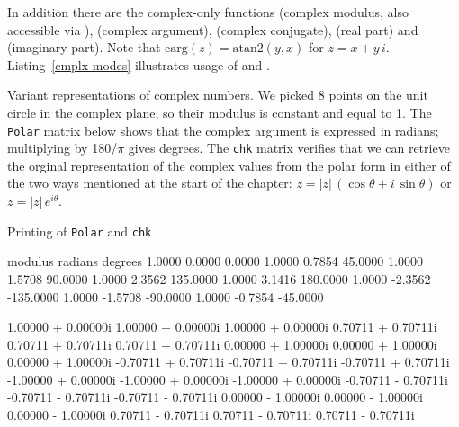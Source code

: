 In addition there are the complex-only functions 
(complex modulus, also accessible via ), 
(complex argument),  (complex conjugate), 
(real part) and  (imaginary part). Note that
$\mbox{carg}(z) = \mbox{atan2}(y,x)$ for $z=x +
y\,i$. Listing~\ref{cmplx-modes} illustrates usage of 
and .

\begin{script}[htbp]
  \caption{Variant representations of complex numbers. We picked 8
    points on the unit circle in the complex plane, so their modulus
    is constant and equal to 1. The \texttt{Polar} matrix below shows
    that the complex argument is expressed in radians; multiplying by
    180/$\pi$ gives degrees. The \texttt{chk} matrix verifies that
    we can retrieve the orginal representation of the complex values
    from the polar form in either of the two ways mentioned at the
    start of the chapter: $z = |z|\,(\cos \theta + i\,\sin \theta)$ or
    $z = |z|\,e^{i\theta}$.}
  \label{cmplx-modes}
  Printing of \texttt{Polar} and \texttt{chk}
\begin{scode}
     modulus     radians     degrees
      1.0000      0.0000      0.0000
      1.0000      0.7854     45.0000
      1.0000      1.5708     90.0000
      1.0000      2.3562    135.0000
      1.0000      3.1416    180.0000
      1.0000     -2.3562   -135.0000
      1.0000     -1.5708    -90.0000
      1.0000     -0.7854    -45.0000

 1.00000 + 0.00000i   1.00000 + 0.00000i   1.00000 + 0.00000i
 0.70711 + 0.70711i   0.70711 + 0.70711i   0.70711 + 0.70711i
 0.00000 + 1.00000i   0.00000 + 1.00000i   0.00000 + 1.00000i
-0.70711 + 0.70711i  -0.70711 + 0.70711i  -0.70711 + 0.70711i
-1.00000 + 0.00000i  -1.00000 + 0.00000i  -1.00000 + 0.00000i
-0.70711 - 0.70711i  -0.70711 - 0.70711i  -0.70711 - 0.70711i
 0.00000 - 1.00000i   0.00000 - 1.00000i   0.00000 - 1.00000i
 0.70711 - 0.70711i   0.70711 - 0.70711i   0.70711 - 0.70711i
\end{scode}
\end{script}

